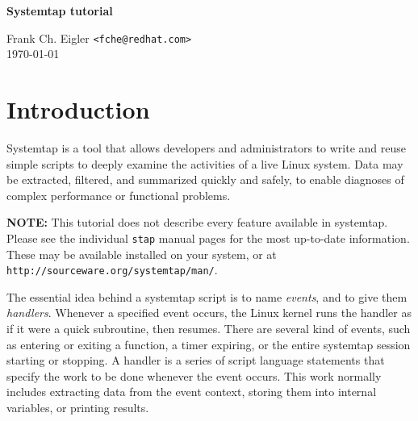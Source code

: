 \documentclass{article}
\renewcommand{\nomenclature}[2]{}
\begin{document}
\begin{center}
\LARGE {\bf Systemtap tutorial}
\end{center}

\hfill \begin{minipage}{2.5in}
Frank Ch. Eigler {\tt \small <fche@redhat.com>} \\
\hfill \today
\end{minipage}

\tableofcontents

\section{Introduction}

Systemtap is a tool that allows developers and administrators to write
and reuse simple scripts to deeply examine the activities of a live
Linux system.  Data may be extracted, filtered, and summarized quickly
and safely, to enable diagnoses of complex performance or functional
problems.

{\bf NOTE:} This tutorial does not describe every feature available in
systemtap.  Please see the individual {\verb+stap+} manual pages for
the most up-to-date information.  These may be available installed on
your system, or at \verb+http://sourceware.org/systemtap/man/+.

\nomenclature{script}{A simple programming language understood by systemtap.}

The essential idea behind a systemtap script is to name {\em events},
and to give them {\em handlers}.  Whenever a specified event occurs,
the Linux kernel runs the handler as if it were a quick subroutine,
then resumes.  There are several kind of events, such as entering or
exiting a function, a timer expiring, or the entire systemtap session
starting or stopping.  A handler is a series of script language
statements that specify the work to be done whenever the event occurs.
This work normally includes extracting data from the event context,
storing them into internal variables, or printing results.

\nomenclature{event}{An identifiable instant in the operating system's
execution state, such as entry to a function, or expiry of a timer.}
\nomenclature{session}{A complete run of a systemtap script program.}
\nomenclature{handler}{A series of statements, written in script, which
is to be performed whenever an event occurs.}
\nomenclature{\tt .stp}{The standard file name extension for systemtap
scripts.}
\end{document}
